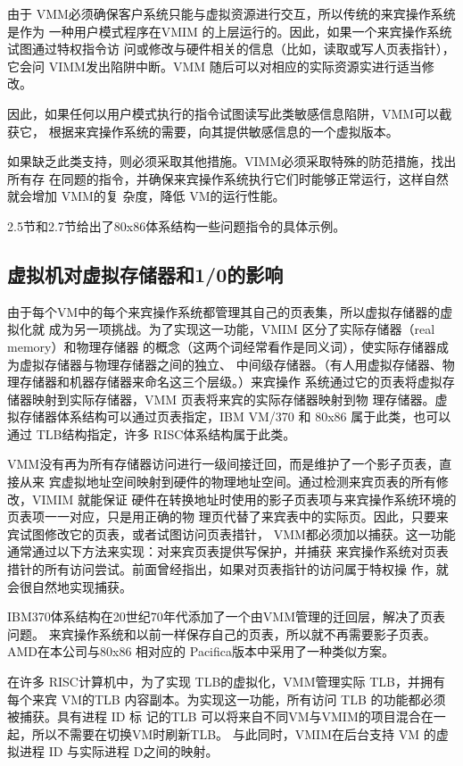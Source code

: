 由于 VMM必须确保客户系统只能与虚拟资源进行交互，所以传统的来宾操作系统是作为
一种用户模式程序在VMIM 的上层运行的。因此，如果一个来宾操作系统试图通过特权指令访
问或修改与硬件相关的信息（比如，读取或写人页表指针），它会问 VIMM发出陷阱中断。VMM
随后可以对相应的实际资源实进行适当修改。

因此，如果任何以用户模式执行的指令试图读写此类敏感信息陷阱，VMM可以截获它，
根据来宾操作系统的需要，向其提供敏感信息的一个虚拟版本。

如果缺乏此类支持，则必须采取其他措施。VIMM必须采取特殊的防范措施，找出所有存
在同题的指令，并确保来宾操作系统执行它们时能够正常运行，这样自然就会增加 VMM的复
杂度，降低 VM的运行性能。

2.5节和2.7节给出了80x86体系结构一些问题指令的具体示例。

\subsection{虚拟机对虚拟存储器和1/0的影响}

由于每个VM中的每个来宾操作系统都管理其自己的页表集，所以虚拟存储器的虚拟化就
成为另一项挑战。为了实现这一功能，VMIM 区分了实际存储器（real memory）和物理存储器
的概念（这两个词经常看作是同义词），使实际存储器成为虚拟存储器与物理存储器之间的独立、
中间级存储器。（有人用虚拟存储器、物理存储器和机器存储器来命名这三个层级。）来宾操作
系统通过它的页表将虚拟存储器映射到实际存储器，VMM 页表将来宾的实际存储器映射到物
理存储器。虚拟存储器体系结构可以通过页表指定，IBM VM/370 和 80x86 属于此类，也可以
通过 TLB结构指定，许多 RISC体系结构属于此类。

VMM没有再为所有存储器访问进行一级间接迁回，而是维护了一个影子页表，直接从来
宾虚拟地址空间映射到硬件的物理地址空间。通过检测来宾页表的所有修改，VIMIM 就能保证
硬件在转换地址时使用的影子页表项与来宾操作系统环境的页表项一一对应，只是用正确的物
理页代替了来宾表中的实际页。因此，只要来宾试图修改它的页表，或者试图访问页表措针，
VMM都必须加以捕获。这一功能通常通过以下方法来实现：对来宾页表提供写保护，并捕获
来宾操作系统对页表措针的所有访问尝试。前面曾经指出，如果对页表指针的访问属于特权操
作，就会很自然地实现捕获。

IBM370体系结构在20世纪70年代添加了一个由VMM管理的迁回层，解决了页表问题。
来宾操作系统和以前一样保存自己的页表，所以就不再需要影子页表。AMD在本公司与80x86
相对应的 Pacifica版本中采用了一种类似方案。

在许多 RISC计算机中，为了实现 TLB的虚拟化，VMM管理实际 TLB，并拥有每个来宾
VM的TLB 内容副本。为实现这一功能，所有访问 TLB 的功能都必须被捕获。具有进程 ID 标
记的TLB 可以将来自不同VM与VMIM的项目混合在一起，所以不需要在切换VM时刷新TLB。
与此同时，VMIM在后台支持 VM 的虚拟进程 ID 与实际进程 D之间的映射。

